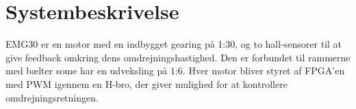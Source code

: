 \section{Systembeskrivelse}
EMG30 er en motor med en indbygget gearing på 1:30, og to hall-sensorer til at give feedback omkring dens omdrejningshastighed. Den er forbundet til rammerne med bælter some har en udveksling på 1:6. Hver motor bliver styret af FPGA'en med PWM igennem en H-bro, der giver mulighed for at kontrollere omdrejningsretningen.